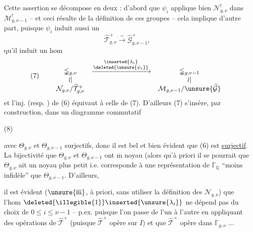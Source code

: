 Cette assertion se décompose en deux :  d'abord que $\psi_i$ applique bien $\mathcal N_{g,\nu}^{!}$ dans $\mathcal M_{g,\nu-1}^{!}$ -- et ceci résulte de la définition  de ces groupes -- cela implique d'autre part, puisque $\psi_i$ induit aussi un  
\[
\widehat{\mathcal T}_{g,\nu}^{+}
\xrightarrow{\sim}
\widehat{\mathcal G}_{g,\nu-1}^{+},
\]
qu'il induit un hom
\[
(7)\qquad
\begin{array}{ccc}
\mathbb{\Gamma}_{g,\nu}
&\xrightarrow{\substack{\inserted{\lambda_i}\\\deleted{\unsure{\psi_i}}}}&
\mathbb{\Gamma}_{g,\nu-1}\\
\wr\vert&&\wr\vert\\
\mathcal N_{g,\nu}/\widehat{\mathcal T}_{g,\nu}^{+}
&&\mathcal M_{g,\nu-1}/\unsure{\widehat{\mathcal G}}
\end{array}
\]
et l'inj. (resp. ) de (6) équivaut à celle de (7). D'ailleurs (7) s'insère, par construction, dans un diagramme commutatif

(8)\quad{}

avec $\Theta_{g,\nu}$ et $\Theta_{g,\nu-1}$ surjectifs, donc il est bel et bien évident que (6) est \uline{surjectif}. La bijectivité  que $\Theta_{g,\nu}$ et $\Theta_{g,\nu-1}$ ont $\overline{\mathrm m}$ noyau (alors qu'à priori il se pourrait que $\Theta_{g,\nu}$ ait un noyau plus petit i.e. corresponde à une représentation de $\mathbb{\Gamma}_{\mathbb Q}$ ``moins infidèle'' que $\Theta_{g,\nu-1}$. D'ailleurs,


il est évident  ($\unsure{\overline{\mathrm m}}$, à priori, sans utiliser la définition   des $\mathcal N_{g,\nu}$) que l'hom $\deleted{\illegible{1}}\inserted{\unsure{\lambda_i}}$  ne dépend pas du choix de $0\leq i\leq\nu-1$ -- p.ex. puisque l'on passe de l'un à l'autre en appliquant des opérations de $\widehat{\mathcal T}^{+}$ (puisque $\widehat{\mathcal T}^{+}$ opère  sur $I$) et que $\widehat{\mathcal T}^{+}$ opère  dans $\mathbb{\Gamma}_{g,\nu}$ ...

